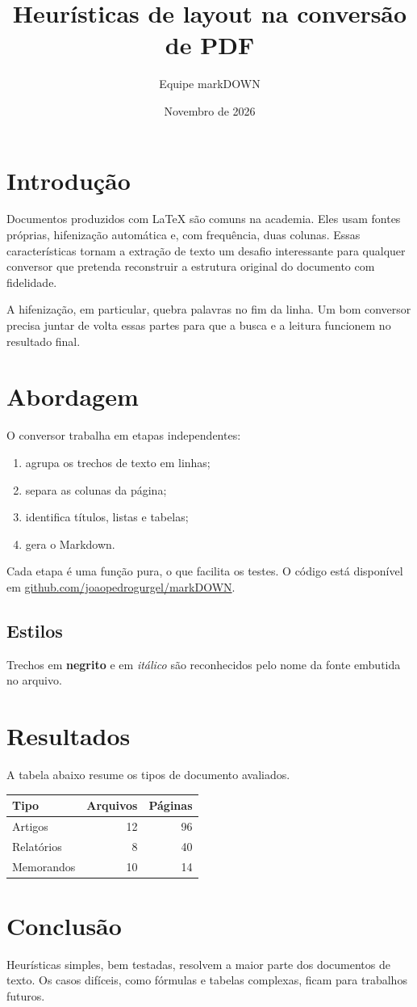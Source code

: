 \documentclass[10pt,twocolumn,a4paper]{article}
\title{Heurísticas de layout na conversão de PDF}
\author{Equipe markDOWN}
\date{Novembro de 2026}
\begin{document}
\maketitle

\section{Introdução}
Documentos produzidos com \LaTeX{} são comuns na academia. Eles usam fontes próprias, hifenização automática e, com frequência, duas colunas. Essas características tornam a extração de texto um desafio interessante para qualquer conversor que pretenda reconstruir a estrutura original do documento com fidelidade.

A hifenização, em particular, quebra palavras no fim da linha. Um bom conversor precisa juntar de volta essas partes para que a busca e a leitura funcionem no resultado final.

\section{Abordagem}
O conversor trabalha em etapas independentes:
\begin{enumerate}
  \item agrupa os trechos de texto em linhas;
  \item separa as colunas da página;
  \item identifica títulos, listas e tabelas;
  \item gera o Markdown.
\end{enumerate}

Cada etapa é uma função pura, o que facilita os testes. O código está disponível em \href{https://github.com/joaopedrogurgel/markDOWN}{github.com/joaopedrogurgel/markDOWN}.

\subsection{Estilos}
Trechos em \textbf{negrito} e em \emph{itálico} são reconhecidos pelo nome da fonte embutida no arquivo.

\section{Resultados}
A tabela abaixo resume os tipos de documento avaliados.

\begin{tabular}{lrr}
\toprule
Tipo & Arquivos & Páginas \\
\midrule
Artigos & 12 & 96 \\
Relatórios & 8 & 40 \\
Memorandos & 10 & 14 \\
\bottomrule
\end{tabular}

\section{Conclusão}
Heurísticas simples, bem testadas, resolvem a maior parte dos documentos de texto. Os casos difíceis, como fórmulas e tabelas complexas, ficam para trabalhos futuros.
\end{document}
